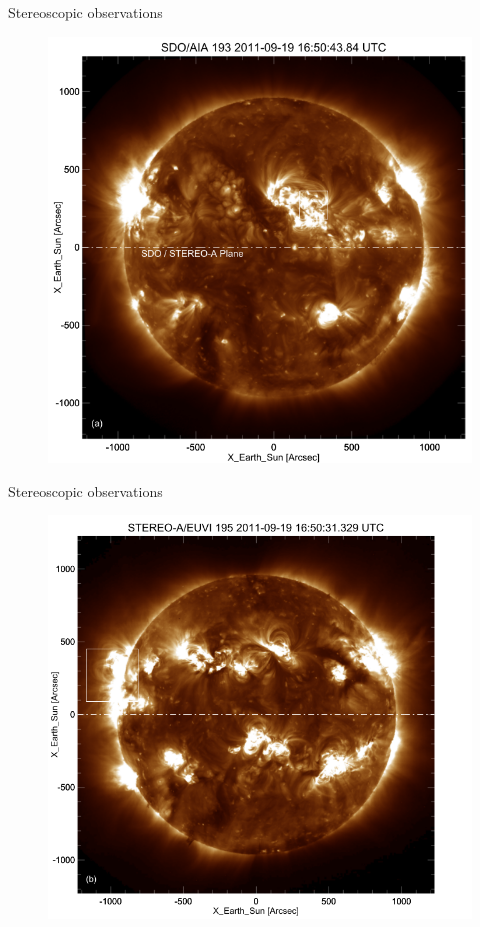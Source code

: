 \documentclass{beamer}
\begin{document}
\begin{frame}{Stereoscopic observations}

\begin{figure}[H]
 \centering
 \includegraphics[scale=0.4]{sp_aia.png}
\end{figure}

\end{frame}
\begin{frame}{Stereoscopic observations}

\begin{figure}[H]
 \centering
 \includegraphics[scale=0.4]{sp_stereo.png}
\end{figure}

\end{frame}
\end{document}
